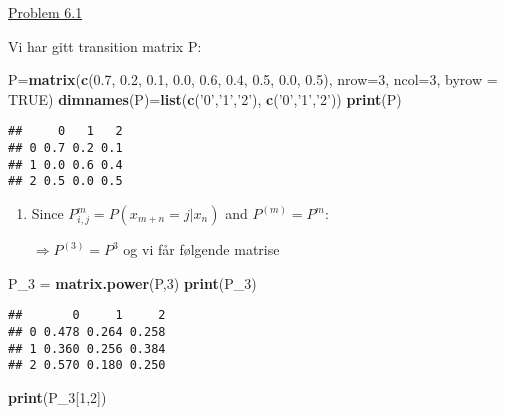 \documentclass[]{article}
\newenvironment{Shaded}{\begin{snugshade}}{\end{snugshade}}
\newcommand{\DataTypeTok}[1]{\textcolor[rgb]{0.13,0.29,0.53}{#1}}
\newcommand{\DecValTok}[1]{\textcolor[rgb]{0.00,0.00,0.81}{#1}}
\newcommand{\FloatTok}[1]{\textcolor[rgb]{0.00,0.00,0.81}{#1}}
\newcommand{\KeywordTok}[1]{\textcolor[rgb]{0.13,0.29,0.53}{\textbf{#1}}}
\newcommand{\NormalTok}[1]{#1}
\newcommand{\OtherTok}[1]{\textcolor[rgb]{0.56,0.35,0.01}{#1}}
\newcommand{\StringTok}[1]{\textcolor[rgb]{0.31,0.60,0.02}{#1}}
\begin{document}
\underline{Problem 6.1}

Vi har gitt transition matrix P:

\begin{Shaded}
\begin{Highlighting}[]
\NormalTok{P=}\KeywordTok{matrix}\NormalTok{(}\KeywordTok{c}\NormalTok{(}\FloatTok{0.7}\NormalTok{, }\FloatTok{0.2}\NormalTok{, }\FloatTok{0.1}\NormalTok{, }\FloatTok{0.0}\NormalTok{, }\FloatTok{0.6}\NormalTok{, }\FloatTok{0.4}\NormalTok{, }\FloatTok{0.5}\NormalTok{, }\FloatTok{0.0}\NormalTok{, }\FloatTok{0.5}\NormalTok{), }\DataTypeTok{nrow=}\DecValTok{3}\NormalTok{, }\DataTypeTok{ncol=}\DecValTok{3}\NormalTok{, }\DataTypeTok{byrow =} \OtherTok{TRUE}\NormalTok{)}
\KeywordTok{dimnames}\NormalTok{(P)=}\KeywordTok{list}\NormalTok{(}\KeywordTok{c}\NormalTok{(}\StringTok{'0'}\NormalTok{,}\StringTok{'1'}\NormalTok{,}\StringTok{'2'}\NormalTok{), }\KeywordTok{c}\NormalTok{(}\StringTok{'0'}\NormalTok{,}\StringTok{'1'}\NormalTok{,}\StringTok{'2'}\NormalTok{))}
\KeywordTok{print}\NormalTok{(P)}
\end{Highlighting}
\end{Shaded}

\begin{verbatim}
##     0   1   2
## 0 0.7 0.2 0.1
## 1 0.0 0.6 0.4
## 2 0.5 0.0 0.5
\end{verbatim}

\begin{enumerate}
\def\labelenumi{\alph{enumi})}
\item
  Since \(P_{i,j}^{m} = P(x_{m+n}=j|x_{n})\) and \(P^{(m)}=P^{m}\):

  \(\Rightarrow{P^{(3)}=P^{3}}\) og vi får følgende matrise
\end{enumerate}

\begin{Shaded}
\begin{Highlighting}[]
\NormalTok{P_}\DecValTok{3}\NormalTok{ =}\StringTok{ }\KeywordTok{matrix.power}\NormalTok{(P,}\DecValTok{3}\NormalTok{)}
\KeywordTok{print}\NormalTok{(P_}\DecValTok{3}\NormalTok{)}
\end{Highlighting}
\end{Shaded}

\begin{verbatim}
##       0     1     2
## 0 0.478 0.264 0.258
## 1 0.360 0.256 0.384
## 2 0.570 0.180 0.250
\end{verbatim}

\begin{Shaded}
\begin{Highlighting}[]
\KeywordTok{print}\NormalTok{(P_}\DecValTok{3}\NormalTok{[}\DecValTok{1}\NormalTok{,}\DecValTok{2}\NormalTok{])}
\end{Highlighting}
\end{Shaded}
\end{document}
